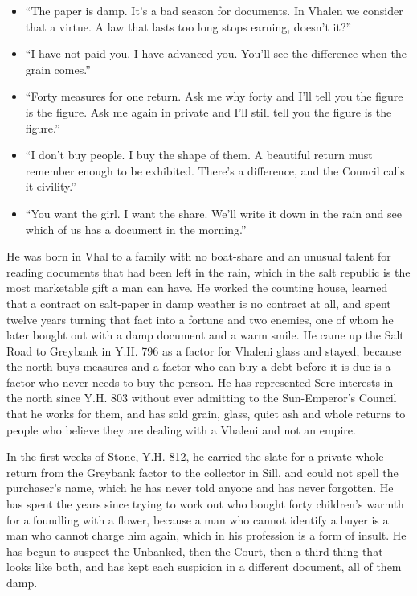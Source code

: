 \documentclass{design/chronicle}
\begin{document}
{\begin{itemize}[leftmargin=1.4em,itemsep=1pt,topsep=3pt,parsep=0pt]

\item “The paper is damp. It’s a bad season for documents. In Vhalen we consider that a virtue. A law that lasts too long stops earning, doesn’t it?”

\item “I have not paid you. I have advanced you. You’ll see the difference when the grain comes.”

\item “Forty measures for one return. Ask me why forty and I’ll tell you the figure is the figure. Ask me again in private and I’ll still tell you the figure is the figure.”

\item “I don’t buy people. I buy the shape of them. A beautiful return must remember enough to be exhibited. There’s a difference, and the Council calls it civility.”

\item “You want the girl. I want the share. We’ll write it down in the rain and see which of us has a document in the morning.”

\end{itemize}

He was born in Vhal to a family with no boat-share and an unusual talent for reading documents that had been left in the rain, which in the salt republic is the most marketable gift a man can have. He worked the counting house, learned that a contract on salt-paper in damp weather is no contract at all, and spent twelve years turning that fact into a fortune and two enemies, one of whom he later bought out with a damp document and a warm smile. He came up the Salt Road to Greybank in Y.H. 796 as a factor for Vhaleni glass and stayed, because the north buys measures and a factor who can buy a debt before it is due is a factor who never needs to buy the person. He has represented Sere interests in the north since Y.H. 803 without ever admitting to the Sun-Emperor’s Council that he works for them, and has sold grain, glass, quiet ash and whole returns to people who believe they are dealing with a Vhaleni and not an empire.

In the first weeks of Stone, Y.H. 812, he carried the slate for a private whole return from the Greybank factor to the collector in Sill, and could not spell the purchaser’s name, which he has never told anyone and has never forgotten. He has spent the years since trying to work out who bought forty children’s warmth for a foundling with a flower, because a man who cannot identify a buyer is a man who cannot charge him again, which in his profession is a form of insult. He has begun to suspect the Unbanked, then the Court, then a third thing that looks like both, and has kept each suspicion in a different document, all of them damp.

}
\end{document}
